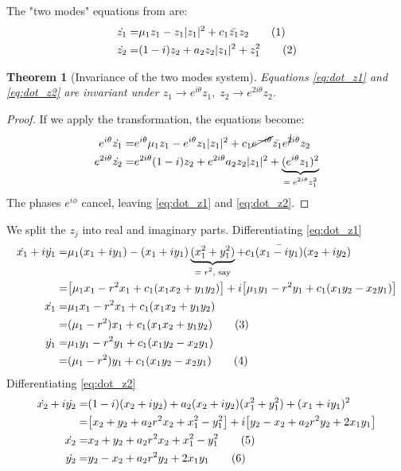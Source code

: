 \documentclass[]{article}
\newcommand\numberthis{\addtocounter{equation}{1}\tag{\theequation}}
\newtheorem{thm}{Theorem}
\begin{document}
The "two modes" equations from \cite[12.4.2]{ChaosBook} are:
\begin{align*}
	\dot{z_1} =& \mu_1 z_1 - z_1 \vert z_1 \vert^2 + c_1 \bar{z_1} z_2  \numberthis \label{eq:dot_z1}\\
	\dot{z_2} =& (1-i)z_2 + a_2z_2 \vert z_1 \vert^2+z_1^2  \numberthis \label{eq:dot_z2}
\end{align*}


\begin{thm}[Invariance of the two modes system]
	Equations \eqref{eq:dot_z1} and \eqref{eq:dot_z2} are invariant under $z_1 \rightarrow e^{i\theta} z_1,\; z_2 \rightarrow e^{2i\theta} z_2$.
\end{thm}
\begin{proof}
	If we apply the transformation, the equations become:
	\begin{align*}
		e^{i\theta} \dot{z_1} =& e^{i\theta} \mu_1 z_1 - e^{i\theta} z_1 \vert z_1 \vert^2 + c_1 \cancel{e^{-i\theta}}   \bar{z_1} e^{\cancel{2}i\theta} z_2 \\
		e^{2i\theta}\dot{z_2} =& e^{2i\theta} (1-i)z_2 + e^{2i\theta} a_2z_2 \vert z_1 \vert^2+\underbrace{(e^{i\theta}z_1)^2}_\text{$= e^{2i\theta}z_1^2$}
	\end{align*}
	The phases $e^{i\phi}$ cancel, leaving \eqref{eq:dot_z1} and \eqref{eq:dot_z2}.
\end{proof}

We split the $z_j$ into real and imaginary parts. Differentiating \eqref{eq:dot_z1}
\begin{align*}
	\dot{x_1} + i\dot{y_1}=& \mu_1(x_1+i y_1) - (x_1+i y_1)  \underbrace{(x_1^2+ y_1^2)}_\text{$= r^2$, say}  + c_1 \bar{(x_1-i y_1)} (x_2+i y_2)\\
	=& \big[\mu_1 x_1 - r^2 x_1 +c_1(x_1x_2+y_1y_2)\big]+ i\big[\mu_1y_1 - r^2 y_1 +c_1(x_1y_2-x_2y_1)\big]\\
	\dot{x_1} =&\mu_1 x_1 - r^2 x_1 +c_1(x_1x_2+y_1y_2)\\
	 =&(\mu_1 - r^2 )x_1 +c_1(x_1x_2+y_1y_2)  \numberthis \label{eq:dot_x1}\\
	\dot{y_1}=& \mu_1y_1 - r^2 y_1 +c_1(x_1y_2-x_2y_1) \\
	=& (\mu_1 - r^2) y_1 +c_1(x_1y_2-x_2y_1)  \numberthis \label{eq:dot_y1}
\end{align*}
Differentiating \eqref{eq:dot_z2}
\begin{align*}
	\dot{x_2} + i\dot{y_2} =& (1-i)(x_2+i y_2) + a_2(x_2+i y_2) (x_1^2+ y_1^2)+(x_1+i y_1)^2\\
	=& \big[x_2+y_2 + a_2 r^2 x_2 +x_1^2-y_1^2\big] + i\big[y_2-x_2+a_2 r^2 y_2 + 2 x_1y_1\big]\\
	\dot{x_2} =&x_2+y_2 + a_2 r^2 x_2 +x_1^2-y_1^2 \numberthis \label{eq:dot_x2}\\
	\dot{y_2}=& y_2-x_2+a_2 r^2 y_2 + 2 x_1y_1  \numberthis \label{eq:dot_y2}
\end{align*}
\end{document}
